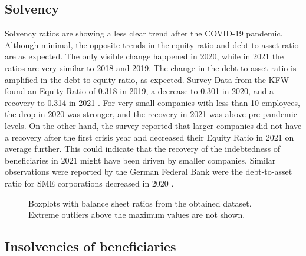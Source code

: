 \subsection{Solvency}

Solvency ratios are showing a less clear trend after the COVID-19 pandemic. Although minimal, the opposite trends in the equity ratio and debt-to-asset ratio are as expected. The only visible change happened in 2020, while in 2021 the ratios are very similar to 2018 and 2019. The change in the debt-to-asset ratio is amplified in the debt-to-equity ratio, as expected. Survey Data from the KFW found an Equity Ratio of 0.318 in 2019, a decrease to 0.301 in 2020, and a recovery to 0.314 in 2021 \parencite{kfw_kfw-mittelstandspanel_2022}. For very small companies with less than 10 employees, the drop in 2020 was stronger, and the recovery in 2021 was above pre-pandemic levels. On the other hand, the survey reported
that larger companies did not have a recovery after the first crisis year and decreased their Equity Ratio in 2021 on average further. 
This could indicate that the recovery of the indebtedness of beneficiaries in 2021 might have been driven by smaller companies. Similar observations were reported by the German Federal Bank were the debt-to-asset ratio for SME corporations decreased in 2020 \parencite{deutsche_bundesbank_jahresabschlussstatistik_2022}.



\begin{figure}
\centering
{}%

\decoRule
\caption[Indicators of liquidity and solvency 2019-2021]{Boxplots with balance sheet ratios from the obtained dataset. Extreme outliers above the maximum values are not shown.}
\label{fig:Ratios}
\end{figure}






\subsection{Insolvencies of beneficiaries}


